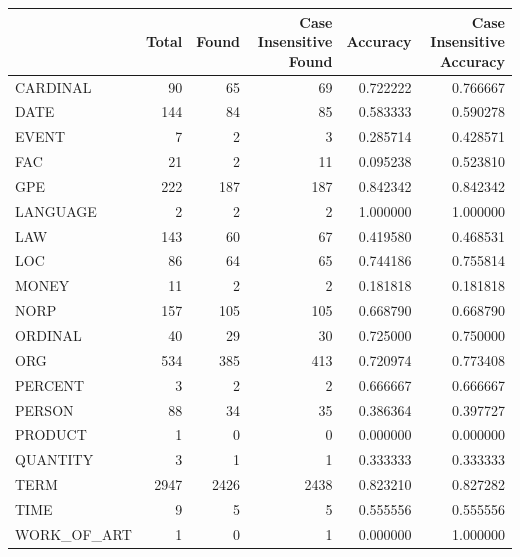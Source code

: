 \begin{tabular}{lrrrrr}
\toprule
 & Total & Found & Case Insensitive Found & Accuracy & Case Insensitive Accuracy \\
\midrule
CARDINAL & 90 & 65 & 69 & 0.722222 & 0.766667 \\
DATE & 144 & 84 & 85 & 0.583333 & 0.590278 \\
EVENT & 7 & 2 & 3 & 0.285714 & 0.428571 \\
FAC & 21 & 2 & 11 & 0.095238 & 0.523810 \\
GPE & 222 & 187 & 187 & 0.842342 & 0.842342 \\
LANGUAGE & 2 & 2 & 2 & 1.000000 & 1.000000 \\
LAW & 143 & 60 & 67 & 0.419580 & 0.468531 \\
LOC & 86 & 64 & 65 & 0.744186 & 0.755814 \\
MONEY & 11 & 2 & 2 & 0.181818 & 0.181818 \\
NORP & 157 & 105 & 105 & 0.668790 & 0.668790 \\
ORDINAL & 40 & 29 & 30 & 0.725000 & 0.750000 \\
ORG & 534 & 385 & 413 & 0.720974 & 0.773408 \\
PERCENT & 3 & 2 & 2 & 0.666667 & 0.666667 \\
PERSON & 88 & 34 & 35 & 0.386364 & 0.397727 \\
PRODUCT & 1 & 0 & 0 & 0.000000 & 0.000000 \\
QUANTITY & 3 & 1 & 1 & 0.333333 & 0.333333 \\
TERM & 2947 & 2426 & 2438 & 0.823210 & 0.827282 \\
TIME & 9 & 5 & 5 & 0.555556 & 0.555556 \\
WORK_OF_ART & 1 & 0 & 1 & 0.000000 & 1.000000 \\
\bottomrule
\end{tabular}

